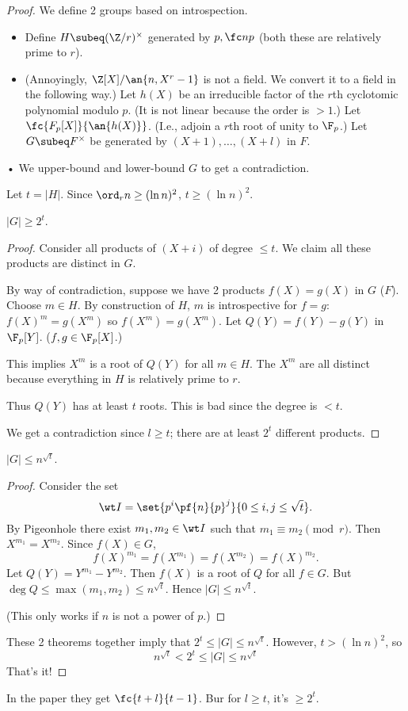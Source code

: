 \begin{proof}
We define 2 groups based on introspection.
\begin{itemize}
\item
Define $H\subeq (\Z/r)^{\times}$ generated by $p,\fc np$ (both these are relatively prime to $r$).
\item
(Annoyingly, $\Z[X]/\an{n,X^{r}-1}$ is not a field. We convert it to a field in the following way.)
Let $h(X)$ be an irreducible factor of the $r$th cyclotomic polynomial modulo $p$. (It is not linear because the order is $>1$.)
Let $\fc{F_p[X]}{\an{h(X)}}$. (I.e., adjoin a $r$th root of unity to $\F_p$.)
Let $G\subeq F^{\times}$ be generated by $(X+1),\ldots, (X+l)$ in $F$.
\end{itemize}•
We upper-bound and lower-bound $G$ to get a contradiction.

Let $t=|H|$. Since $\ord_r n \ge (\ln n)^2$, $t\ge (\ln n)^2$.
\begin{thm}
$|G|\ge 2^t$.
\end{thm}
\begin{proof}
Consider all products of $(X+i)$ of degree $\le t$. We claim all these products are distinct in $G$. 

By way of contradiction, suppose we have 2 products $f(X)=g(X)$ in $G$ ($F$). Choose $m\in H$. By construction of $H$, $m$ is introspective for $f=g$: $f(X)^m=g(X^m)$ so $f(X^m)=g(X^m)$. %
Let $Q(Y)=f(Y)-g(Y)$ in $\F_p[Y]$. ($f,g\in \F_p[X]$.)

This implies $X^m$ is a root of $Q(Y)$ for all $m\in H$. The $X^m$ are all distinct because everything in $H$ is relatively prime to $r$.

Thus $Q(Y)$ has at least $t$ roots. This is bad since the degree is $<t$. %

We get a contradiction since $l\ge t$; there are at least $2^t$ different products.
\end{proof}
\begin{thm}
$|G|\le n^{\sqrt t}$.
\end{thm}
\begin{proof}
Consider the set
\[
\wt I = \set{p^i\pf{n}{p}^j}{0\le i,j\le \sqrt t}.
\]
By Pigeonhole there exist $m_1,m_2\in \wt I$ such that $m_1\equiv m_2\pmod r$.
Then $X^{m_1}=X^{m_2}$. 
Since $f(X)\in G$,
\[
f(X)^{m_1}=f(X^{m_1})=f(X^{m_2}) = f(X)^{m_2}.
\]
Let $Q(Y)=Y^{m_1}-Y^{m_2}$. Then $f(X)$ is a root of $Q$ for all $f\in G$. But $\deg Q\le \max (m_1,m_2)\le n^{\sqrt t}$. Hence $|G|\le n^{\sqrt t}$.

(This only works if $n$ is not a power of $p$.)
\end{proof}
These 2 theorems together imply that $2^t\le |G|\le n^{\sqrt t}$. However, $t> (\ln n)^2$, so 
\[
n^{\sqrt t}< 2^t\le |G|\le n^{\sqrt t}
\]
That's it!
\end{proof}
In the paper they get $\fc{t+l}{t-1}$. Bur for $l\ge t$, it's $\ge 2^t$.


%
 
%
%
